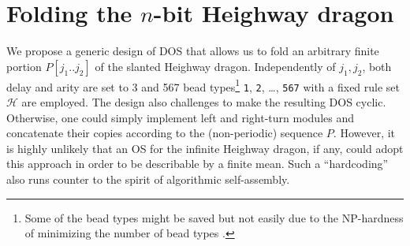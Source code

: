 \documentclass[dvipdfmx,review]{elsarticle}
\begin{document}
	\section{Folding the $n$-bit Heighway dragon}

We propose a generic design of DOS that allows us to fold an arbitrary finite portion $P[j_1 .. j_2]$ of the slanted Heighway dragon. 
Independently of $j_1, j_2$, both delay and arity are set to 3 and 567 bead types\footnote{Some of the bead types might be saved but not easily due to the NP-hardness of minimizing the number of bead types \cite{HanKim2017}.} \texttt{1}, \texttt{2}, \dots, \texttt{567} with a fixed rule set $\mathcal{H}$ are employed. 
The design also challenges to make the resulting DOS cyclic. 
Otherwise, one could simply implement left and right-turn modules and concatenate their copies according to the (non-periodic) sequence $P$. 
However, it is highly unlikely that an OS for the infinite Heighway dragon, if any, could adopt this approach in order to be describable by a finite mean. 
Such a ``hardcoding'' also runs counter to the spirit of algorithmic self-assembly. 
\end{document}
